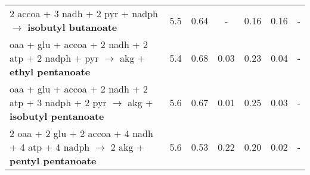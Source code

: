 {\begin{tabular}{lcccccc}
2 accoa + 3 nadh  + 2 pyr + nadph $\rightarrow$ \textbf{isobutyl butanoate}					&5.5&0.64&-&0.16&0.16&- \\
oaa + glu  + accoa +  2 nadh + 2 atp + 2 nadph  + pyr $\rightarrow$  akg + \textbf{ethyl pentanoate}		&5.4&0.68&0.03&0.23&0.04&- \\
oaa + glu  + accoa + 2 nadh + 2 atp + 3 nadph + 2 pyr $\rightarrow$ akg + \textbf{isobutyl pentanoate}		&5.6&0.67&0.01&0.25&0.03&- \\
2 oaa + 2 glu  + 2 accoa +  4 nadh + 4 atp + 4 nadph  $\rightarrow$ 2 akg + \textbf{pentyl pentanoate}		&5.6&0.53&0.22&0.20&0.02&- \\
\hline
\end{tabular}}
